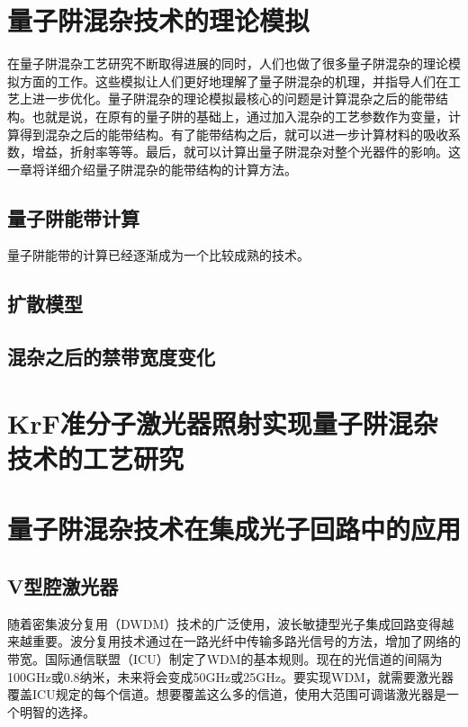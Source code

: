 \documentclass{ZJUthesis}
\begin{document}
\chapter{量子阱混杂技术的理论模拟}

在量子阱混杂工艺研究不断取得进展的同时，人们也做了很多量子阱混杂的理论模拟方面的工作。这些模拟让人们更好地理解了量子阱混杂的机理，并指导人们在工艺上进一步优化。量子阱混杂的理论模拟最核心的问题是计算混杂之后的能带结构。也就是说，在原有的量子阱的基础上，通过加入混杂的工艺参数作为变量，计算得到混杂之后的能带结构。有了能带结构之后，就可以进一步计算材料的吸收系数，增益，折射率等等。最后，就可以计算出量子阱混杂对整个光器件的影响。这一章将详细介绍量子阱混杂的能带结构的计算方法。

\section{量子阱能带计算}

量子阱能带的计算已经逐渐成为一个比较成熟的技术。

\section{扩散模型}

\section{混杂之后的禁带宽度变化}

\chapter{KrF准分子激光器照射实现量子阱混杂技术的工艺研究}




\chapter{量子阱混杂技术在集成光子回路中的应用}

\section{V型腔激光器}

随着密集波分复用（DWDM）技术的广泛使用，波长敏捷型光子集成回路变得越来越重要。波分复用技术通过在一路光纤中传输多路光信号的方法，增加了网络的带宽。国际通信联盟（ICU）制定了WDM的基本规则。现在的光信道的间隔为100GHz或0.8纳米，未来将会变成50GHz或25GHz。要实现WDM，就需要激光器覆盖ICU规定的每个信道。想要覆盖这么多的信道，使用大范围可调谐激光器是一个明智的选择。
\end{document}
